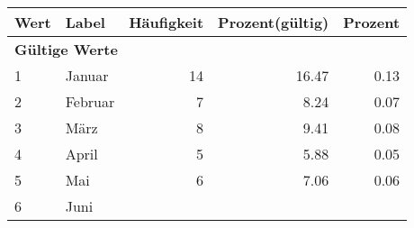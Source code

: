      \begin{longtable}{lXrrr}
     \toprule
     \textbf{Wert} & \textbf{Label} & \textbf{Häufigkeit} & \textbf{Prozent(gültig)} & \textbf{Prozent} \\
     \endhead
     \midrule
     \multicolumn{5}{l}{\textbf{Gültige Werte}}\\

     1 &
     \multicolumn{1}{X}{ Januar   } &


       \num{14} &
       \num[round-mode=places,round-precision=2]{16,47} &
         \num[round-mode=places,round-precision=2]{0,13} \\

     2 &
     \multicolumn{1}{X}{ Februar   } &


       \num{7} &
       \num[round-mode=places,round-precision=2]{8,24} &
         \num[round-mode=places,round-precision=2]{0,07} \\

     3 &
     \multicolumn{1}{X}{ März   } &


       \num{8} &
       \num[round-mode=places,round-precision=2]{9,41} &
         \num[round-mode=places,round-precision=2]{0,08} \\

     4 &
     \multicolumn{1}{X}{ April   } &


       \num{5} &
       \num[round-mode=places,round-precision=2]{5,88} &
         \num[round-mode=places,round-precision=2]{0,05} \\

     5 &
     \multicolumn{1}{X}{ Mai   } &


       \num{6} &
       \num[round-mode=places,round-precision=2]{7,06} &
         \num[round-mode=places,round-precision=2]{0,06} \\

     6 &
     \multicolumn{1}{X}{ Juni   } &



\end{longtable}
